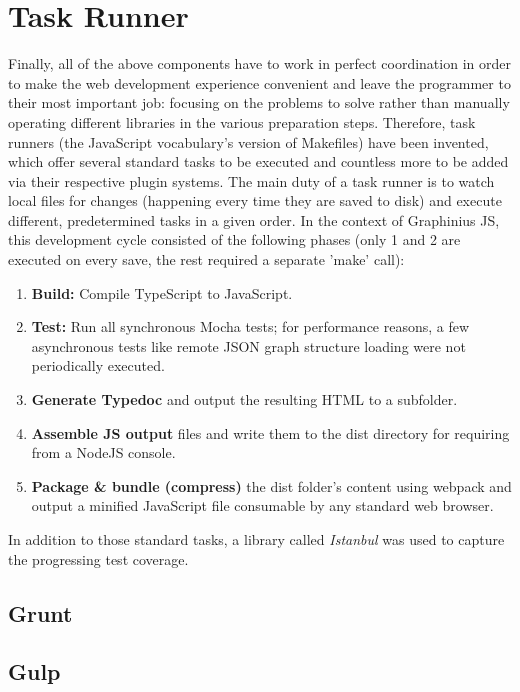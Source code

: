 \section{Task Runner}
\label{sect:build_system}

	Finally, all of the above components have to work in perfect coordination in order to make the web development experience convenient and leave the programmer to their most important job: focusing on the problems to solve rather than manually operating different libraries in the various preparation steps. Therefore, task runners (the JavaScript vocabulary's version of Makefiles) have been invented, which offer several standard tasks to be executed and countless more to be added via their respective plugin systems. The main duty of a task runner is to watch local files for changes (happening every time they are saved to disk) and execute different, predetermined tasks in a given order. In the context of Graphinius JS, this development cycle consisted of the following phases (only 1 and 2 are executed on every save, the rest required a separate 'make' call):
	
	\begin{enumerate}
		\item \textbf{Build:} Compile TypeScript to JavaScript.
		\item \textbf{Test:} Run all synchronous Mocha tests; for performance reasons, a few asynchronous tests like remote JSON graph structure loading were not periodically executed.
		\item \textbf{Generate Typedoc} and output the resulting HTML to a subfolder.
		\item \textbf{Assemble JS output} files and write them to the dist directory for requiring from a NodeJS console.
		\item \textbf{Package \& bundle (compress)} the dist folder's content using webpack and output a minified JavaScript file consumable by any standard web browser.
	\end{enumerate}
	
	In addition to those standard tasks, a library called \textit{Istanbul} was used to capture the progressing test coverage.

	\subsection{Grunt}
	\label{ssect:grunt}
	
	
	
	\subsection{Gulp}
	\label{ssect:gulp}
	
